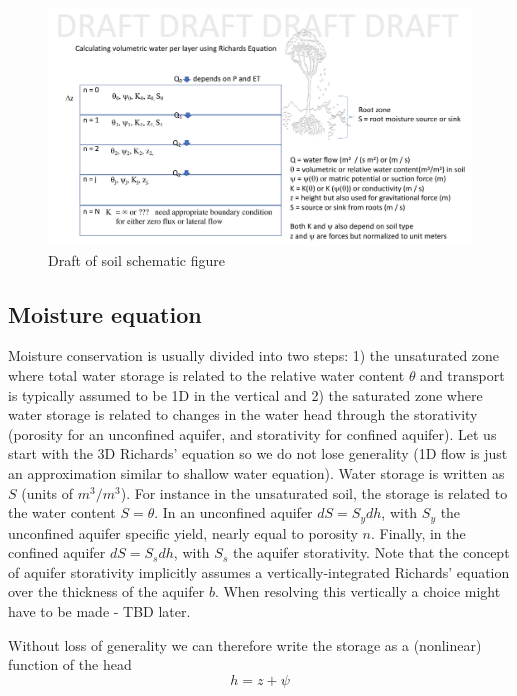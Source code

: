 \documentclass{article}
\begin{document}
\begin{figure}[htb]
\includegraphics[scale=.15]{CLIMA-land/LM_figures/SoilSchematic-1.png}
\caption{Draft of soil schematic figure}
\end{figure}

\subsection{Moisture equation}
Moisture conservation is usually divided into two steps: 1) the unsaturated zone where total water storage is related to the relative water content $\theta$ and transport is typically assumed to be 1D in the vertical and 2) the saturated zone where water storage is related to changes in the water head through the storativity (porosity for an unconfined aquifer, and storativity for confined aquifer).
Let us start with the 3D Richards' equation so we do not lose generality (1D flow is just an approximation similar to shallow water equation). Water storage is written as $S$ (units of $m^3/m^3$). For instance in the unsaturated soil, the storage is related to the water content $S=\theta$. In an unconfined aquifer $dS=S_y dh$, with $S_y$ the unconfined aquifer specific yield, nearly equal to porosity $n$. Finally, in the confined aquifer $dS=S_s dh$, with $S_s$ the aquifer storativity. Note that the concept of aquifer storativity implicitly assumes a vertically-integrated Richards' equation over the thickness of the aquifer $b$. When resolving this vertically a choice might have to be made - TBD later.

Without loss of generality we can therefore write the storage as a (nonlinear) function of the head 
\begin{equation}
     h=z+\psi
\label{head}
\end{equation}
\end{document}
